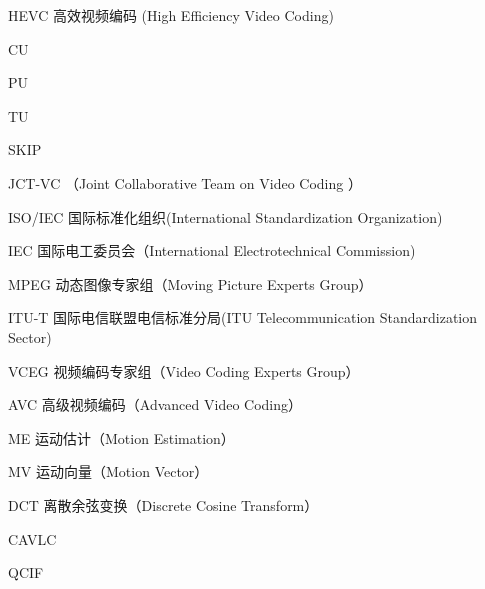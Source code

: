 \begin{denotation}[3cm]
\item[HEVC] 高效视频编码 (High Efficiency Video Coding)
\item[CU] 
\item[PU] 
\item[TU] 
\item[SKIP]
\item[JCT-VC] （Joint Collaborative Team on Video Coding ）
\item[ISO/IEC] 国际标准化组织(International Standardization Organization)
\item[IEC] 国际电工委员会（International Electrotechnical Commission)
\item[MPEG] 动态图像专家组（Moving Picture Experts Group）
\item[ITU-T] 国际电信联盟电信标准分局(ITU Telecommunication Standardization Sector)
\item[VCEG] 视频编码专家组（Video Coding Experts Group）
\item[AVC] 高级视频编码（Advanced Video Coding）
\item[ME] 运动估计（Motion Estimation）
\item[MV] 运动向量（Motion Vector）
\item[DCT] 离散余弦变换（Discrete Cosine Transform）
\item[CAVLC]
\item[QCIF]
\end{denotation}
